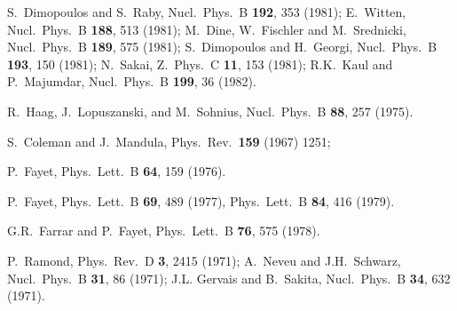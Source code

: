 \documentclass[11pt]{article}
\begin{document}
\begin{thebibliography}{999}
S.~Dimopoulos and S.~Raby,
  Nucl.\ Phys.\ B {\bf 192}, 353 (1981);
E.~Witten, 
  Nucl.\ Phys.\ B {\bf 188}, 513 (1981);
M.~Dine, W.~Fischler and M.~Srednicki,
  Nucl.\ Phys.\ B {\bf 189}, 575 (1981);
S.~Dimopoulos and H.~Georgi, 
  Nucl.\ Phys.\ B {\bf 193}, 150 (1981);
N.~Sakai, 
  Z.\ Phys.\ C {\bf 11}, 153 (1981);
R.K.~Kaul and P.~Majumdar, 
  Nucl.\ Phys.\ B {\bf 199}, 36 (1982).

R.~Haag, J.~Lopuszanski, and M.~Sohnius,
  Nucl.\ Phys.\ B {\bf 88}, 257 (1975).

S.~Coleman and J.~Mandula, 
  Phys.\ Rev.\  {\bf 159} (1967) 1251;

P.~Fayet,
  Phys.\ Lett.\ B {\bf 64}, 159 (1976).

P.~Fayet,
  Phys.\ Lett.\ B {\bf 69}, 489 (1977),
  Phys.\ Lett.\ B {\bf 84}, 416 (1979).

G.R.~Farrar and P.~Fayet,
  Phys.\ Lett.\ B {\bf 76}, 575 (1978).

P.~Ramond, 
  Phys.\ Rev.\ D {\bf 3}, 2415 (1971);
A.~Neveu and J.H.~Schwarz, 
  Nucl.\ Phys.\ B {\bf 31}, 86 (1971);
J.L. Gervais and B.~Sakita, 
  Nucl.\ Phys.\ B {\bf 34}, 632 (1971).


\end{thebibliography}
\end{document}
